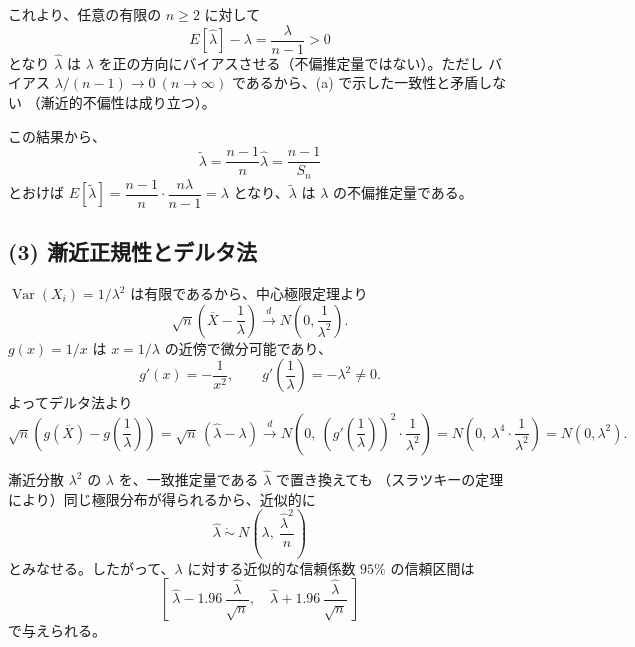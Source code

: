 これより、任意の有限の $n \ge 2$ に対して
\[
E[\hat{\lambda}] - \lambda = \frac{\lambda}{n-1} > 0
\]
となり $\hat{\lambda}$ は $\lambda$ を正の方向にバイアスさせる（不偏推定量ではない）。ただし
バイアス $\lambda/(n-1) \to 0\ (n \to \infty)$ であるから、(a) で示した一致性と矛盾しない
（漸近的不偏性は成り立つ）。

この結果から、
\[
\tilde{\lambda} = \frac{n-1}{n}\hat{\lambda} = \frac{n-1}{S_n}
\]
とおけば $E[\tilde{\lambda}] = \dfrac{n-1}{n} \cdot \dfrac{n\lambda}{n-1} = \lambda$ となり、$\tilde{\lambda}$ は
$\lambda$ の不偏推定量である。

\subsection*{(3) 漸近正規性とデルタ法}

$\operatorname{Var}(X_i) = 1/\lambda^{2}$ は有限であるから、中心極限定理より
\[
\sqrt{n}\left(\overline{X} - \frac{1}{\lambda}\right) \xrightarrow{d} N\!\left(0, \frac{1}{\lambda^{2}}\right).
\]
$g(x) = 1/x$ は $x = 1/\lambda$ の近傍で微分可能であり、
\[
g'(x) = -\frac{1}{x^{2}}, \qquad g'\!\left(\frac{1}{\lambda}\right) = -\lambda^{2} \ne 0 .
\]
よってデルタ法より
\[
\sqrt{n}\left(g(\overline{X}) - g\!\left(\frac{1}{\lambda}\right)\right)
= \sqrt{n}\,(\hat{\lambda} - \lambda)
\xrightarrow{d} N\!\left(0,\ \left(g'\!\left(\frac{1}{\lambda}\right)\right)^{2} \cdot \frac{1}{\lambda^{2}}\right)
= N\!\left(0,\ \lambda^{4} \cdot \frac{1}{\lambda^{2}}\right)
= N(0, \lambda^{2}).
\]

漸近分散 $\lambda^{2}$ の $\lambda$ を、一致推定量である $\hat{\lambda}$ で置き換えても
（スラツキーの定理により）同じ極限分布が得られるから、近似的に
\[
\hat{\lambda} \ \dot\sim\ N\!\left(\lambda,\ \frac{\hat{\lambda}^{2}}{n}\right)
\]
とみなせる。したがって、$\lambda$ に対する近似的な信頼係数 $95\%$ の信頼区間は
\[
\left[\ \hat{\lambda} - 1.96\, \frac{\hat{\lambda}}{\sqrt{n}},\quad \hat{\lambda} + 1.96\, \frac{\hat{\lambda}}{\sqrt{n}}\ \right]
\]
で与えられる。
